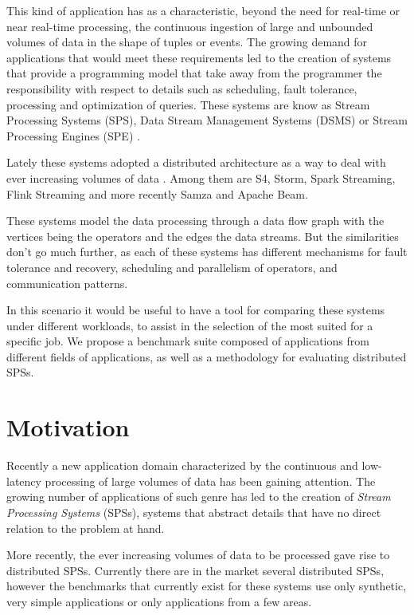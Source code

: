 \documentclass[ppgc,diss,english]{iiufrgs}
\begin{document}
This kind of application has as a characteristic, beyond the need for real-time or near real-time processing, the continuous ingestion of large and unbounded volumes of data in the shape of tuples or events. The growing demand for applications that would meet these requirements led to the creation of systems that provide a programming model that take away from the programmer the responsibility with respect to details such as scheduling, fault tolerance, processing and optimization of queries. These systems are know as Stream Processing Systems (SPS), Data Stream Management Systems (DSMS) \cite{chakravarthy2009stream} or Stream Processing Engines (SPE) \cite{abadi2005design}.

Lately these systems adopted a distributed architecture as a way to deal with ever increasing volumes of data \cite{zaharia2012discretized}. Among them are S4, Storm, Spark Streaming, Flink Streaming and more recently Samza and Apache Beam.

These systems model the data processing through a data flow graph with the vertices being the operators and the edges the data streams. But the similarities don't go much further, as each of these systems has different mechanisms for fault tolerance and recovery, scheduling and parallelism of operators, and communication patterns.

In this scenario it would be useful to have a tool for comparing these systems under different workloads, to assist in the selection of the most suited for a specific job. We propose a benchmark suite composed of applications from different fields of applications, as well as a methodology for evaluating distributed SPSs.

\section{Motivation}

Recently a new application domain characterized by the continuous and low-latency processing of large volumes of data has been gaining attention. The growing number of applications of such genre has led to the creation of \emph{Stream Processing Systems} (SPSs), systems that abstract details that have no direct relation to the problem at hand.

More recently, the ever increasing volumes of data to be processed gave rise to distributed SPSs. Currently there are in the market several distributed SPSs, however the benchmarks that currently exist for these systems use only synthetic, very simple applications or only applications from a few areas.
\end{document}
